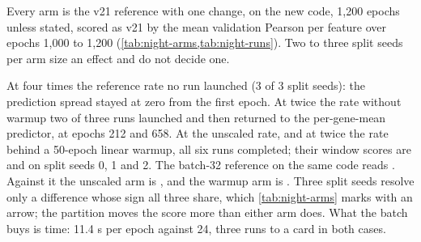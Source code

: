  Every arm is the v21 reference with one
change, on the new code, 1{,}200 epochs unless stated, scored as v21 by the mean validation
Pearson per feature over epochs 1{,}000 to 1{,}200 (\cref{tab:night-arms,tab:night-runs}).
Two to three split seeds per arm size an effect and do not decide one.

\begin{table}[htbp]
  \centering
  \footnotesize
  \caption[]{\textbf{Batch 128 trains as far as the reference in half the time when its
  learning rate is left alone or warmed up, and collapses when it is scaled without
  warmup.} A run is \emph{collapsed} when its prediction spread ratio never reached 0.05 in
  300 epochs, or reached it and then stayed below 0.01 for 50 consecutive epochs, the
  per-gene-mean predictor; such runs were stopped. The highest arm mean is bold; an arrow
  marks an arm whose complete runs are all above or all below the reference on shared split
  seeds.}
  \label{tab:night-arms}
  
\end{table}

\begin{table}[htbp]
  \centering
  \footnotesize
  \setlength{\tabcolsep}{3pt}
  \caption[]{\textbf{Every run of v22, with its W\&B link.} The three ladder columns are the
  mean validation Pearson per feature over the 20 epochs ending at that epoch, so runs
  stopped early can still be compared at matched epochs. A run with no entry in the window
  column did not finish 1{,}200 epochs; the state column gives the last epoch reached in
  parentheses. The highest window score is bold.}
  \label{tab:night-runs}
  
\end{table}

 At four times the
reference rate no run launched (3 of 3 split seeds): the prediction spread stayed at zero
from the first epoch. At twice the rate without warmup two of three runs launched and then
returned to the per-gene-mean predictor, at epochs 212 and 658. At the unscaled rate, and
at twice the rate behind a 50-epoch linear warmup, all six runs completed; their window
scores are \nightLrOneWindows{} and \nightWarmupWindows{} on split seeds 0, 1 and 2. The
batch-32 reference on the same code reads \nightRefWindows. Against it the unscaled arm is
\nightLrOneVsRef, and the warmup arm is \nightWarmupVsRef. Three split seeds resolve only
a difference whose sign all three share, which \cref{tab:night-arms} marks with an arrow;
the partition moves the score more than either arm does. What the batch buys is time: 11.4 s
per epoch against 24, three runs to a card in both cases.

